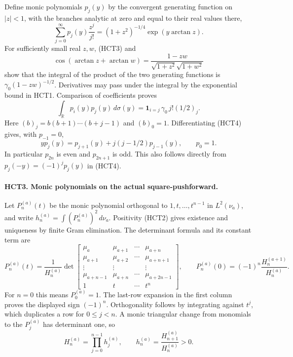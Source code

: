 \documentclass[11pt,a4paper]{article}
\begin{document}
Define monic polynomials $p_j(y)$ by the convergent generating function
on $|z|<1$, with the branches analytic at zero and equal to their
real values there,
\begin{equation}\tag{HCT4}
 \sum_{j=0}^\infty p_j(y)\frac{z^j}{j!}
 =(1+z^2)^{-1/4}\exp(y\arctan z).
\end{equation}
For sufficiently small real $z,w$, (HCT3) and
\[
 \cos(\arctan z+\arctan w)
 =\frac{1-zw}{\sqrt{1+z^2}\sqrt{1+w^2}}
\]
show that the integral of the product of the two generating functions
is $\gamma_0(1-zw)^{-1/2}$. Derivatives may pass under the integral
by the exponential bound in HCT1. Comparison of coefficients proves
\begin{equation}\tag{HCT5}
 \int_{\mathbb R}p_i(y)p_j(y)\,d\sigma(y)
 =\mathbf1_{i=j}\,\gamma_0\,j!(1/2)_j.
\end{equation}
Here $(b)_j=b(b+1)\cdots(b+j-1)$ and $(b)_0=1$.
Differentiating (HCT4) gives, with $p_{-1}=0$,
\begin{equation}\tag{HCT6}
 y p_j(y)=p_{j+1}(y)+j(j-1/2)p_{j-1}(y),\qquad p_0=1.
\end{equation}
In particular $p_{2n}$ is even and $p_{2n+1}$ is odd. This also
follows directly from $p_j(-y)=(-1)^j p_j(y)$ in (HCT4).

\paragraph{HCT3. Monic polynomials on the actual square-pushforward.}
Let $P_n^{(a)}(t)$ be the monic polynomial orthogonal to
$1,t,\ldots,t^{n-1}$ in $L^2(\nu_a)$, and write
$h_n^{(a)}=\int(P_n^{(a)})^2\,d\nu_a$.
Positivity (HCT2) gives existence and uniqueness by finite
Gram elimination. The determinant formula and its constant term are
\begin{equation}\tag{HCT7}
 P_n^{(a)}(t)=\frac1{H_n^{(a)}}
 \det\begin{bmatrix}
 \mu_a&\mu_{a+1}&\cdots&\mu_{a+n}\\
 \mu_{a+1}&\mu_{a+2}&\cdots&\mu_{a+n+1}\\
 \vdots&\vdots&&\vdots\\
 \mu_{a+n-1}&\mu_{a+n}&\cdots&\mu_{a+2n-1}\\
 1&t&\cdots&t^n
 \end{bmatrix},\qquad
 P_n^{(a)}(0)=(-1)^n\frac{H_n^{(a+1)}}{H_n^{(a)}}.
\end{equation}
For $n=0$ this means $P_0^{(a)}=1$. The last-row expansion in the
first column proves the displayed sign $(-1)^n$. Orthogonality
follows by integrating against $t^j$, which duplicates a row for
$0\leq j<n$. A monic triangular change from monomials to the
$P_j^{(a)}$ has determinant one, so
\begin{equation}\tag{HCT8}
 H_n^{(a)}=\prod_{j=0}^{n-1}h_j^{(a)},\qquad
 h_n^{(a)}=\frac{H_{n+1}^{(a)}}{H_n^{(a)}}>0.
\end{equation}
\end{document}
